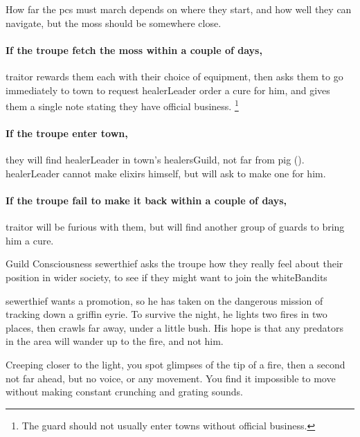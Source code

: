 How far the \glspl{pc} must march depends on where they start, and how well they can navigate,%
but the moss should be somewhere close.

\paragraph{If the troupe fetch the moss within a couple of days,}
\gls{traitor} rewards them each with their choice of equipment, then asks them to go immediately to \gls{town} to request \gls{healerLeader} order a cure for him, and gives them a single note stating they have official business.%
\footnote{The \gls{guard} should not usually enter towns without official business.}

\paragraph{If the troupe enter \gls{town},}
they will find \gls{healerLeader} in \gls{town}'s \gls{healersGuild}, not far from \gls{pig} ().
\gls{healerLeader} cannot make \glspl{elixir} himself, but will ask  to make one for him.

\paragraph{If the troupe fail to make it back within a couple of days,}
\gls{traitor} will be furious with them, but will find another group of \glspl{guard} to bring him a cure.

{Guild Consciousness}%
{\gls{sewerthief} asks the troupe how they really feel about their position in wider society, to see if they might want to join the \gls{whiteBandits}}%

\Gls{sewerthief} wants a promotion, so he has taken on the dangerous mission of tracking down a griffin eyrie.
To survive the night, he lights two fires in two places, then crawls far away, under a little bush.
His hope is that any predators in the area will wander up to the fire, and not him.

\begin{boxtext}
  Creeping closer to the light, you spot glimpses of the tip of a fire, then a second not far ahead, but no voice, or any movement.
  You find it impossible to move without making constant crunching and grating sounds.
\end{boxtext}

